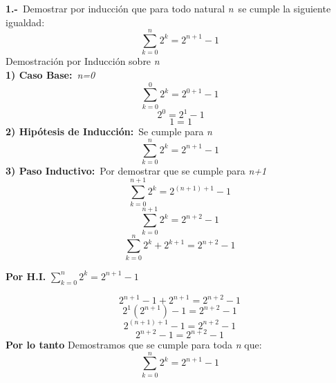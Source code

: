 \textbf{1.-}\ Demostrar por inducción que para todo natural \textit{n}\ se cumple la siguiente igualdad:
\[
\sum_{k=0}^{n}2^k = 2^{n+1}-1
\]
Demostración por Inducción sobre \textit{n}\\
\newline
\textbf{1) Caso Base:}\ \textit{n=0}\
\[
\sum_{k=0}^{0}2^k = 2^{0+1}-1 
\]
\[
\ 2^{0}= 2^{1}-1
\]
\[
\ 1 = 1
\] 
\textbf{2) Hipótesis de Inducción:}\  Se cumple para \textit{n}\
\[
\sum_{k=0}^{n}2^k = 2^{n+1}-1
\]
\textbf{3) Paso Inductivo:}\  Por demostrar que se cumple para \textit{n+1}\
\[
\sum_{k=0}^{n+1}2^k = 2^{(n+1)+1}-1
\]
\[
\sum_{k=0}^{n+1}2^k = 2^{n+2}-1
\]
\[
\sum_{k=0}^{n}2^k + 2^{k+1} = 2^{n+2}-1
\]
\begin{center}
\textbf{Por H.I.} $\sum_{k=0}^{n}2^k = 2^{n+1}-1$ 
\end{center}
\[
2^{n+1} - 1 +2^{n+1} = 2^{n+2}-1
\]
\[
2^{1}(2^{n+1}) - 1 = 2^{n+2}-1
\]
\[
2^{(n+1)+1} -1 = 2^{n+2}-1
\]
\[
2^{n+2} - 1= 2^{n+2}-1
\]
\newline
\textbf{Por lo tanto} Demostramos que se cumple para toda \textit{n} que: 
\[
\sum_{k=0}^{n}2^k = 2^{n+1}-1
\]
